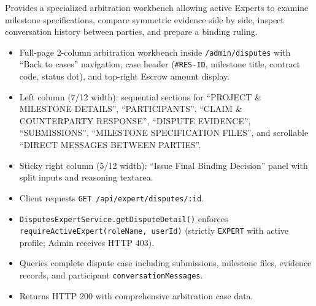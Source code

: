\noindent Provides a specialized arbitration workbench allowing active Experts to examine milestone specifications, compare symmetric evidence side by side, inspect conversation history between parties, and prepare a binding ruling.

\begin{itemize}[leftmargin=1.6em,topsep=3pt,itemsep=2pt,parsep=0pt,label=$\bullet$]
      \item Full-page 2-column arbitration workbench inside \texttt{/admin/disputes} with ``Back to cases'' navigation, case header (\texttt{\#RES-ID}, milestone title, contract code, status dot), and top-right Escrow amount display.
      \item Left column (7/12 width): sequential sections for ``PROJECT \& MILESTONE DETAILS'', ``PARTICIPANTS'', ``CLAIM \& COUNTERPARTY RESPONSE'', ``DISPUTE EVIDENCE'', ``SUBMISSIONS'', ``MILESTONE SPECIFICATION FILES'', and scrollable ``DIRECT MESSAGES BETWEEN PARTIES''.
      \item Sticky right column (5/12 width): ``Issue Final Binding Decision'' panel with split inputs and reasoning textarea.
\end{itemize}

\begin{itemize}[leftmargin=1.6em,topsep=3pt,itemsep=2pt,parsep=0pt,label=$\bullet$]
      \item Client requests \texttt{GET /\allowbreak{}api/\allowbreak{}expert/\allowbreak{}disputes/\allowbreak{}:\allowbreak{}id}.
      \item {\sloppy \texttt{DisputesExpertService.\allowbreak{}getDisputeDetail()} enforces \texttt{requireActiveExpert(roleName, userId)} (strictly \texttt{EXPERT} with active profile; Admin receives HTTP 403).\par}
      \item Queries complete dispute case including submissions, milestone files, evidence records, and participant \texttt{conversationMessages}.
      \item Returns HTTP 200 with comprehensive arbitration case data.
\end{itemize}

